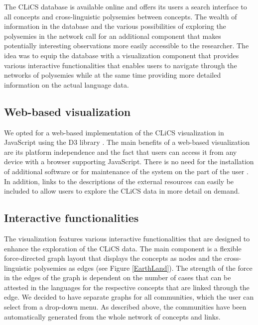The CLiCS database is available online and offers its users a search interface to all concepts and cross-linguistic polysemies between concepts. The wealth of information in the database and the various possibilities of exploring the polysemies in the network call for an additional component that makes potentially interesting observations more easily accessible to the researcher. The idea was to equip the database with a visualization component that provides various interactive functionalities that enables users to navigate through the networks of polysemies while at the same time providing more detailed information on the actual language data.  

\subsection{Web-based visualization}

We opted for a web-based implementation of the CLiCS visualization in JavaScript using the D3 library \cite{D3}. The main benefits of a web-based visualization are its platform independence and the fact that users can access it from any device with a browser supporting JavaScript. There is no need for the installation of additional software or for maintenance of the system on the part of the user \cite{Murray}. In addition, links to the descriptions of the external resources can easily be included to allow users to explore the CLiCS data in more detail on demand. 

\subsection{Interactive functionalities}



The visualization features various interactive functionalities that are designed to enhance the exploration of the CLiCS data. The main component is a flexible force-directed graph layout that displays the concepts as nodes and the cross-linguistic polysemies as edges (see Figure \ref{EarthLand}). The strength of the force in the edges of the graph is dependent on the number of cases that can be attested in the languages for the respective concepts that are linked through the edge. We decided to have separate graphs for all communities, which the user can select from a drop-down menu. As described above, the communities have been automatically generated from the whole network of concepts and links. 

